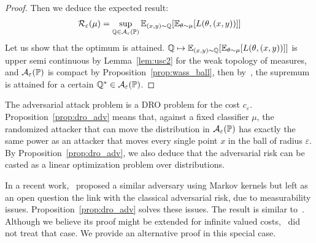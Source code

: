 \begin{proof}
Then we deduce the expected result:
\begin{align*}
\risk_\varepsilon(\mu)= \sup_{\QQ\in\mathcal{A}_\varepsilon(\PP)}\mathbb{E}_{(x,y)\sim\QQ}\left[\mathbb{E}_{\theta\sim\mu}\left[\loss(\theta,(x,y))\right]\right]
\end{align*}
Let us show that the optimum is attained. $\QQ\mapsto\mathbb{E}_{(x,y)\sim\QQ}\left[\mathbb{E}_{\theta\sim\mu}\left[\loss(\theta,(x,y))\right]\right]$ is upper semi continuous by Lemma~\ref{lem:usc2} for the weak topology of measures, and $\mathcal{A}_\varepsilon(\mathbb{P})$ is compact by Proposition~\ref{prop:wass_ball}, then by~\citep[Proposition 7.32]{bertsekas2004stochastic}, the supremum is attained for a certain $\mathbb{Q}^*\in\mathcal{A}_\varepsilon(\mathbb{P})$. 

\end{proof}

The adversarial attack problem is a DRO problem for the cost $c_\varepsilon$.
Proposition~\ref{prop:dro_adv} means that, against a fixed classifier $\mu$, the randomized attacker that can move the distribution in $\mathcal{A}_\varepsilon(\mathbb{P})$ has exactly the same power as an attacker that moves every single point $x$ in the ball of radius $\varepsilon$.  By Proposition~\ref{prop:dro_adv}, we also  deduce that the adversarial risk can be casted as a linear optimization problem over distributions.

\begin{rmq}
  In a recent work,~\citep{pydi2019adversarial} proposed a similar adversary using Markov kernels but left as an open question the link with the classical adversarial risk, due to measurability issues. Proposition~\ref{prop:dro_adv} solves these issues. The result is similar to~\citep{blanchet2019quantifying}. Although we believe its proof might be extended for infinite valued costs,~\citep{blanchet2019quantifying} did not treat that case. We provide an alternative proof in this special case. 
\end{rmq}



